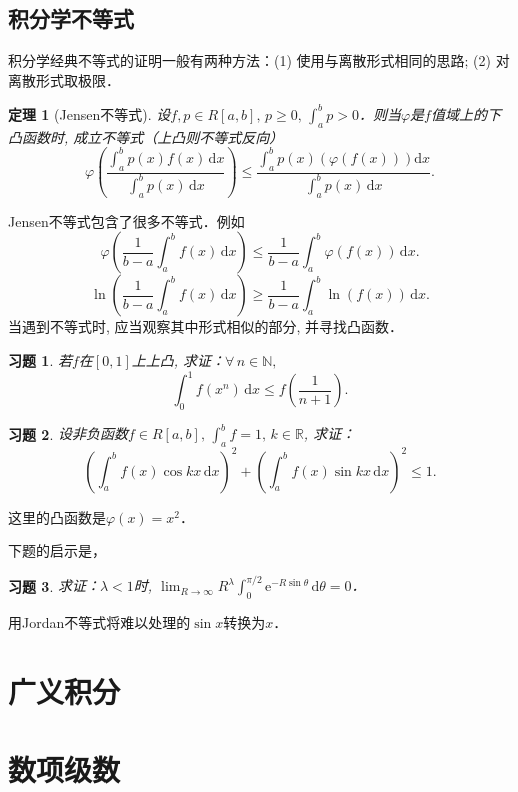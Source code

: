 \documentclass[11pt,a4paper]{ctexart}
\makeatletter
\theoremstyle{thmseries} %
\newtheorem{thm}{定理}[section]
\theoremstyle{exerseries}
\newtheorem{exer}{习题}[section]
\renewenvironment{proof}[1][\proofname]{\par
  \pushQED{\qed}%
  \normalfont \topsep6\p@\@plus6\p@\relax
  \trivlist
  \item[\hskip\labelsep
        \itshape
    #1\@addpunct{}]\ignorespaces
}{%
  \popQED\endtrivlist\@endpefalse
}
\newenvironment{pf}{\begin{proof}[\bfseries\upshape 证\quad]}{\end{proof}}
\newcommand{\bra}[1]{\mathopen{}\left(#1\right)}
\renewcommand{\phi}{\varphi}
\newcommand{\R}{\mathbb{R}}
\newcommand{\N}{\mathbb{N}}
\renewcommand{\d}{\mathrm{d}}
\newcommand{\e}{\mathrm{e}}
\makeatother
\begin{document}
\subsection{积分学不等式}
积分学经典不等式的证明一般有两种方法：(1) 使用与离散形式相同的思路; (2) 对离散形式取极限．
\begin{thm}[Jensen不等式]
	设$f,p\in R[a,b],\,p\geq0,\,\int_{a}^{b}p>0$．则当$\phi$是$f$值域上的下凸函数时, 成立不等式（上凸则不等式反向）
	\[\phi\bra{\frac{\int_{a}^{b}p(x)f(x)\,\d x}{\int_{a}^{b}p(x)\,\d x}}\leq\frac{\int_{a}^{b}p(x)\bra{\phi(f(x))}\d x}{\int_{a}^{b}p(x)\,\d x}.\]
\end{thm}

Jensen不等式包含了很多不等式．例如
\[\phi\bra{\frac{1}{b-a}\int_{a}^{b}f(x)\,\d x}\leq\frac{1}{b-a}\int_{a}^{b}\phi(f(x))\,\d x.\]
\[\ln\bra{\frac{1}{b-a}\int_{a}^{b}f(x)\,\d x}\geq\frac{1}{b-a}\int_{a}^{b}\ln(f(x))\,\d x.\]
当遇到不等式时, 应当观察其中形式相似的部分, 并寻找凸函数．

\begin{exer}
	若$f$在$[0,1]$上上凸, 求证：$\forall\,n\in\N,$
	\[\int_{0}^{1}f(x^n)\,\d x\leq f\bra{\frac{1}{n+1}}.\]
\end{exer}

\begin{exer}
	设非负函数$f\in R[a,b],\,\int_{a}^{b}f=1,\,k\in\R$, 求证：
	\[\bra{\int_{a}^{b}f(x)\cos kx\,\d x}^2+\bra{\int_{a}^{b}f(x)\sin kx\,\d x}^2\leq1.\]
\end{exer}
\begin{pf}
	这里的凸函数是$\phi(x)=x^2$．
\end{pf}

下题的启示是，

\begin{exer}
	求证：$\lambda<1$时, $\lim_{R\to\infty}R^\lambda\int_{0}^{\pi/2}\e^{-R\sin\theta}\,\d\theta=0$．
\end{exer}
\begin{pf}
	用Jordan不等式将难以处理的$\sin x$转换为$x$．
\end{pf}


\section{广义积分}


\section{数项级数}
\end{document}
